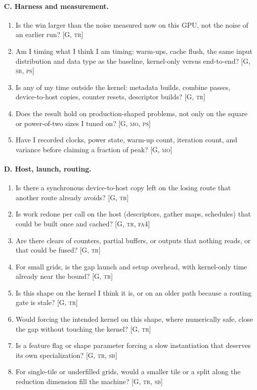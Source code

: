 \paragraph{C. Harness and measurement.}
\begin{enumerate}[nosep,leftmargin=*,resume]
\item Is the win larger than the noise measured now on this GPU, not the noise of an earlier run? [G, \textsc{tr}]
\item Am I timing what I think I am timing: warm-ups, cache flush, the same input distribution and data type as the baseline, kernel-only versus end-to-end? [G, \textsc{sb}, \textsc{ps}]
\item Is any of my time outside the kernel: metadata builds, combine passes, device-to-host copies, counter resets, descriptor builds? [G, \textsc{tr}]
\item Does the result hold on production-shaped problems, not only on the square or power-of-two sizes I tuned on? [G, \textsc{mo}, \textsc{ps}]
\item Have I recorded clocks, power state, warm-up count, iteration count, and variance before claiming a fraction of peak? [G, \textsc{mo}]
\end{enumerate}

\paragraph{D. Host, launch, routing.}
\begin{enumerate}[nosep,leftmargin=*,resume]
\item Is there a synchronous device-to-host copy left on the losing route that another route already avoids? [G, \textsc{tr}]
\item Is work redone per call on the host (descriptors, gather maps, schedules) that could be built once and cached? [G, \textsc{tr}, \textsc{fa4}]
\item Are there clears of counters, partial buffers, or outputs that nothing reads, or that could be fused? [G, \textsc{tr}]
\item For small grids, is the gap launch and setup overhead, with kernel-only time already near the bound? [G, \textsc{tr}]
\item Is this shape on the kernel I think it is, or on an older path because a routing gate is stale? [G, \textsc{tr}]
\item Would forcing the intended kernel on this shape, where numerically safe, close the gap without touching the kernel? [G, \textsc{tr}]
\item Is a feature flag or shape parameter forcing a slow instantiation that deserves its own specialization? [G, \textsc{tr}, \textsc{sb}]
\item For single-tile or underfilled grids, would a smaller tile or a split along the reduction dimension fill the machine? [G, \textsc{tr}, \textsc{sb}]
\end{enumerate}

